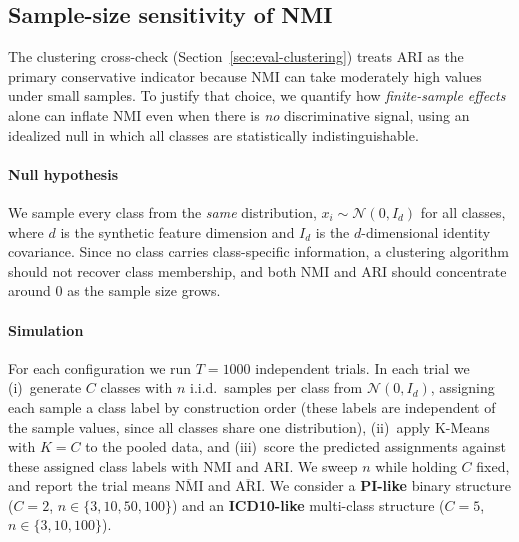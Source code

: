 \subsection{Sample-size sensitivity of NMI}
\label{sec:eval-nmi-sensitivity}

The clustering cross-check (Section~\ref{sec:eval-clustering}) treats ARI as the primary conservative indicator because NMI can take moderately high values under small samples.
To justify that choice, we quantify how \emph{finite-sample effects} alone can inflate NMI
even when there is \emph{no} discriminative signal, using an idealized null in which all
classes are statistically indistinguishable.

\paragraph{Null hypothesis} We sample every class from the \emph{same} distribution, $x_{i}\sim\mathcal{N}(0,I_{d})$ for all classes, where $d$ is the synthetic feature dimension and $I_d$ is the $d$-dimensional identity covariance. 
Since no class carries class-specific information, a clustering algorithm should not recover class membership,
and both NMI and ARI should concentrate around $0$ as the sample size grows.

\paragraph{Simulation} For each configuration we run $T=1000$ independent trials. 
In each trial we 
(i)~generate $C$ classes with $n$ i.i.d.\ samples per class from $\mathcal{N}(0,I_d)$, assigning each sample a class label by construction order (these labels are independent of the sample values, since all classes share one distribution),
(ii)~apply K-Means with $K=C$ to the pooled data, and
(iii)~score the predicted assignments against these assigned class labels with NMI and ARI.
We sweep $n$ while holding $C$ fixed, and report the trial means $\overline{\mathrm{NMI}}$ and $\overline{\mathrm{ARI}}$. 
We consider a \textbf{PI-like} binary structure ($C=2$, $n\in\{3,10,50,100\}$) and an \textbf{ICD10-like} multi-class structure ($C=5$, $n\in\{3,10,100\}$).

